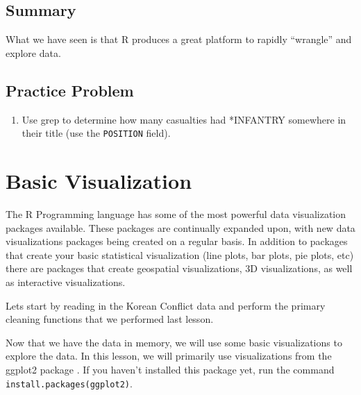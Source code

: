 \documentclass[]{book}
\newenvironment{Shaded}{\begin{snugshade}}{\end{snugshade}}
\newcommand{\KeywordTok}[1]{\textcolor[rgb]{0.13,0.29,0.53}{\textbf{{#1}}}}
\newcommand{\DataTypeTok}[1]{\textcolor[rgb]{0.13,0.29,0.53}{{#1}}}
\newcommand{\StringTok}[1]{\textcolor[rgb]{0.31,0.60,0.02}{{#1}}}
\newcommand{\OtherTok}[1]{\textcolor[rgb]{0.56,0.35,0.01}{{#1}}}
\newcommand{\NormalTok}[1]{{#1}}
\providecommand{\tightlist}{%
  \setlength{\itemsep}{0pt}\setlength{\parskip}{0pt}}
\begin{document}
\section{Summary}\label{summary}

What we have seen is that R produces a great platform to rapidly
``wrangle'' and explore data.

\section{Practice Problem}\label{practice-problem-1}

\begin{enumerate}
\def\labelenumi{\arabic{enumi}.}
\tightlist
\item
  Use grep to determine how many casualties had *INFANTRY somewhere in
  their title (use the \texttt{POSITION} field).
\end{enumerate}

\chapter{Basic Visualization}\label{basic-visualization}

The R Programming language has some of the most powerful data
visualization packages available. These packages are continually
expanded upon, with new data visualizations packages being created on a
regular basis. In addition to packages that create your basic
statistical visualization (line plots, bar plots, pie plots, etc) there
are packages that create geospatial visualizations, 3D visualizations,
as well as interactive visualizations.

Lets start by reading in the Korean Conflict data and perform the
primary cleaning functions that we performed last lesson.

\begin{Shaded}
\end{Shaded}

Now that we have the data in memory, we will use some basic
visualizations to explore the data. In this lesson, we will primarily
use visualizations from the ggplot2 package \citep{R-ggplot2}. If you
haven't installed this package yet, run the command
\texttt{install.packages(\textquotesingle{}ggplot2\textquotesingle{})}.
\end{document}
